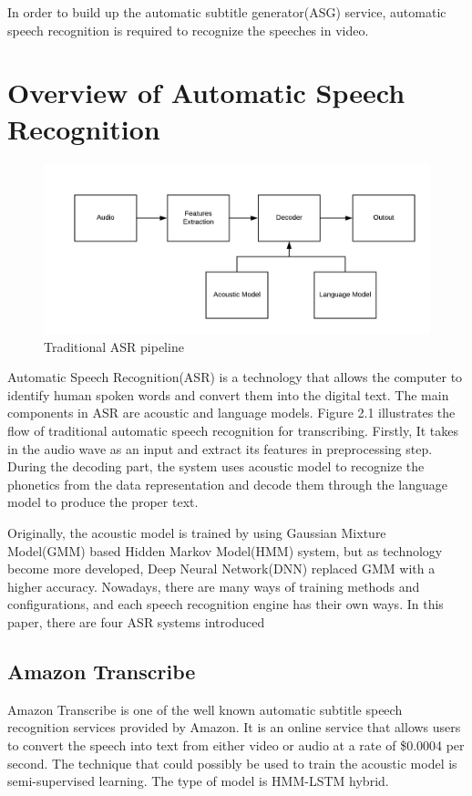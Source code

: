 \documentclass[natbib]{muthesis}
\begin{document}
  In order to build up the automatic subtitle generator(ASG) service, automatic speech recognition is required to recognize the speeches in video.
  \section{Overview of Automatic Speech Recognition}
  
  \begin{figure}[H]
  	\centering
  	\captionsetup{justification=centering}
  	\includegraphics{images/traditional-asr}
  	\caption{Traditional ASR pipeline}
  	\label{fig:traditional-asr}
  \end{figure}
  Automatic Speech Recognition(ASR) is a technology that allows the computer to identify human spoken words and convert them into the digital text. The main components in ASR are acoustic and language models.
  Figure 2.1 illustrates the flow of traditional automatic speech recognition for transcribing.
  Firstly, It takes in the audio wave as an input and extract its features in preprocessing step. During the decoding part, the system uses acoustic model to recognize the phonetics from the data representation and decode them through the language model to produce the proper text. 
  
  Originally, the acoustic model is trained by using Gaussian Mixture Model(GMM) based Hidden Markov Model(HMM) system, but as technology become more developed, Deep Neural Network(DNN) replaced GMM with a higher accuracy.\cite{Shivakumar_2019} Nowadays, there are many ways of training methods and configurations, and each speech recognition engine has their own ways. In this paper, there are four ASR systems introduced
  \subsection{Amazon Transcribe}
  Amazon Transcribe is one of the well known automatic subtitle speech recognition services provided by Amazon. It is an online service that allows users to convert the speech into text from either video or audio at a rate of \$0.0004 per second. The technique that could possibly be used to train the acoustic model is semi-supervised learning. The type of model is HMM-LSTM hybrid.\cite{parthasarathi2019lessons}
\end{document}
